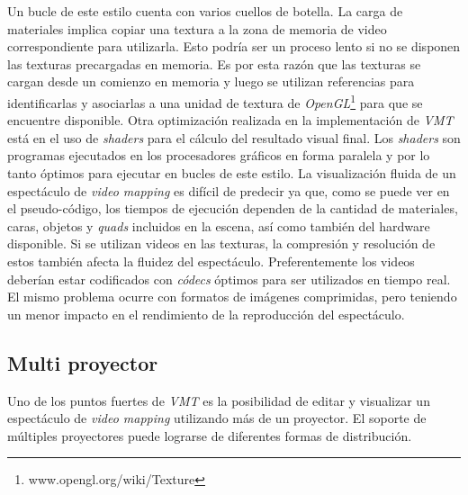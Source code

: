 Un bucle de este estilo cuenta con varios cuellos de botella.
La carga de materiales implica copiar una textura a la zona de memoria de video correspondiente para utilizarla. Esto podría ser un proceso lento si no se disponen las texturas precargadas en memoria. Es por esta razón que las texturas se cargan desde un comienzo en memoria y luego se utilizan referencias para identificarlas y asociarlas a una unidad de textura de \emph{OpenGL}\footnote{www.opengl.org/wiki/Texture} para que se encuentre disponible.
Otra optimización realizada en la implementación de \emph{VMT} está en el uso de \emph{shaders} para el cálculo del resultado visual final. Los \emph{shaders} son programas ejecutados en los procesadores gráficos en forma paralela y por lo tanto óptimos para ejecutar en bucles de este estilo.
La visualización fluida de un espectáculo de \emph{video mapping} es difícil de predecir ya que, como se puede ver en el pseudo-código, los tiempos de ejecución dependen de la cantidad de materiales, caras, objetos y \emph{quads} incluidos en la escena, así como también del hardware disponible.
Si se utilizan videos en las texturas, la compresión y resolución de estos también afecta la fluidez del espectáculo. Preferentemente los videos deberían estar codificados con \emph{códecs} óptimos para ser utilizados en tiempo real. El mismo problema ocurre con formatos de imágenes comprimidas, pero teniendo un menor impacto en el rendimiento de la reproducción del espectáculo.

\subsection{Multi proyector}

Uno de los puntos fuertes de \emph{VMT} es la posibilidad de editar y visualizar un espectáculo de \emph{video mapping} utilizando más de un proyector. El soporte de múltiples proyectores puede lograrse de diferentes formas de distribución.

